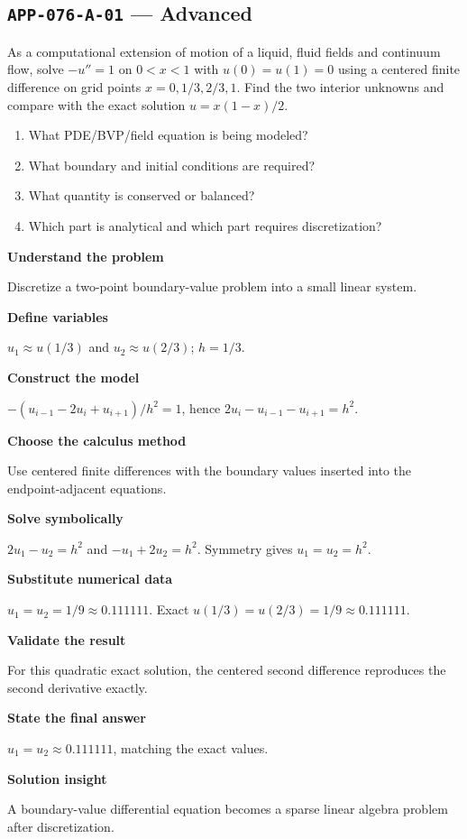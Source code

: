 \documentclass[11pt]{book}
\newcommand{\pid}[1]{\texttt{#1}}
\begin{document}
\subsection*{\pid{APP-076-A-01} — Advanced}
\begin{problembox}
As a computational extension of motion of a liquid, fluid fields and continuum flow, solve $-u''=1$ on $0<x<1$ with $u(0)=u(1)=0$ using a centered finite difference on grid points $x=0,1/3,2/3,1$. Find the two interior unknowns and compare with the exact solution $u=x(1-x)/2$.
\end{problembox}
\begin{promptbox}\begin{enumerate}
\item What PDE/BVP/field equation is being modeled?
\item What boundary and initial conditions are required?
\item What quantity is conserved or balanced?
\item Which part is analytical and which part requires discretization?
\end{enumerate}\end{promptbox}
\begin{solutionbox}
\textbf{Understand the problem}\par Discretize a two-point boundary-value problem into a small linear system.\par\medskip
\textbf{Define variables}\par $u_1\approx u(1/3)$ and $u_2\approx u(2/3)$; $h=1/3$.\par\medskip
\textbf{Construct the model}\par $-(u_{i-1}-2u_i+u_{i+1})/h^2=1$, hence $2u_i-u_{i-1}-u_{i+1}=h^2$.\par\medskip
\textbf{Choose the calculus method}\par Use centered finite differences with the boundary values inserted into the endpoint-adjacent equations.\par\medskip
\textbf{Solve symbolically}\par $2u_1-u_2=h^2$ and $-u_1+2u_2=h^2$. Symmetry gives $u_1=u_2=h^2$.\par\medskip
\textbf{Substitute numerical data}\par $u_1=u_2=1/9\approx 0.111111$. Exact $u(1/3)=u(2/3)=1/9\approx 0.111111$.\par\medskip
\textbf{Validate the result}\par For this quadratic exact solution, the centered second difference reproduces the second derivative exactly.\par\medskip
\textbf{State the final answer}\par $u_1=u_2\approx 0.111111$, matching the exact values.\par\medskip
\textbf{Solution insight}\par A boundary-value differential equation becomes a sparse linear algebra problem after discretization.\par\medskip
\end{solutionbox}
\end{document}

